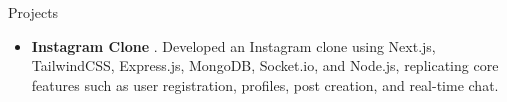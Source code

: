 \documentclass[]{mcdowellcv}
\begin{document}
	\begin{cvsection}{Projects}
		\begin{cvsubsection}{}{}{}
			\begin{itemize}
				\item \textbf{Instagram Clone} \href{https://github.com/pl3lee/instagram-clone}{\faGithub}. Developed an Instagram clone using Next.js, TailwindCSS, Express.js, MongoDB, Socket.io, and Node.js, replicating core features such as user registration, profiles, post creation, and real-time chat.
			\end{itemize}
		\end{cvsubsection}
	\end{cvsection}
	
\end{document}
